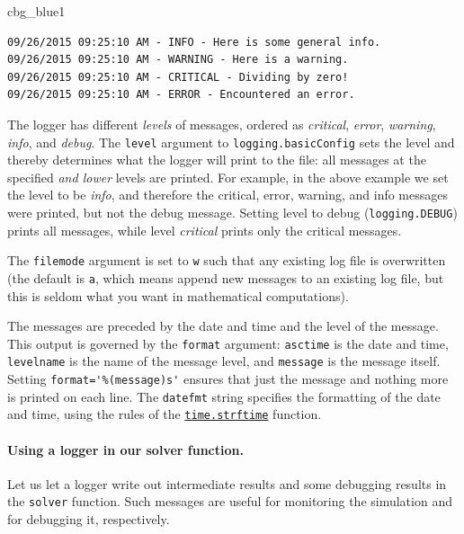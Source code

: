 \documentclass[%
oneside,                 %
final,                   %
10pt]{article}
\newenvironment{_cod_tight}[1]{
   \def\FrameCommand{\colorbox{#1}}
   \FrameRule0.6pt\MakeFramed {\FrameRestore}\vskip3mm}
   {\vskip0mm\endMakeFramed}
\newenvironment{cod}[1]{
\bgroup\rmfamily
\fboxsep=0mm\relax
\begin{_cod_tight}{#1}
\list{}{\parsep=-2mm\parskip=0mm\topsep=0pt\leftmargin=2mm
\rightmargin=2\leftmargin\leftmargin=4pt\relax}
\item\relax}
{\endlist\end{_cod_tight}\egroup}
\begin{document}
\begin{cod}{cbg_blue1}\begin{Verbatim}[numbers=none,fontsize=\fontsize{9pt}{9pt},baselinestretch=0.95,xleftmargin=2mm]
09/26/2015 09:25:10 AM - INFO - Here is some general info.
09/26/2015 09:25:10 AM - WARNING - Here is a warning.
09/26/2015 09:25:10 AM - CRITICAL - Dividing by zero!
09/26/2015 09:25:10 AM - ERROR - Encountered an error.
\end{Verbatim}
\end{cod}
\noindent
The logger has different \emph{levels} of messages, ordered as
\emph{critical}, \emph{error}, \emph{warning}, \emph{info}, and \emph{debug}.
The \texttt{level} argument to \texttt{logging.basicConfig} sets the level
and thereby determines what the logger will print to the file:
all messages at the specified \emph{and lower} levels are printed.
For example, in the above example we set the level to be
\emph{info}, and therefore the critical, error, warning, and info
messages were printed, but not the debug message.
Setting level to debug (\texttt{logging.DEBUG}) prints all messages,
while level \emph{critical} prints only the critical messages.

The \texttt{filemode} argument is set to \texttt{w} such that any existing
log file is overwritten (the default is \texttt{a}, which means append
new messages to an existing log file, but this is seldom what
you want in mathematical computations).

The messages are preceded by the date and time and the level of
the message. This output is governed by the \texttt{format} argument:
\texttt{asctime} is the date and time, \texttt{levelname} is the name of
the message level, and \texttt{message} is the message itself.
Setting \Verb!format='%(message)s'! ensures that just the message and
nothing more is printed on each line. The \texttt{datefmt} string
specifies the formatting of the date and time, using the
rules of the \href{{https://docs.python.org/2/library/time.html#time.strftime}}{\nolinkurl{time.strftime}} function.

\paragraph{Using a logger in our solver function.}
Let us let a logger write out intermediate results and some debugging
results in the \texttt{solver} function. Such messages are useful for
monitoring the simulation and for debugging it, respectively.
\end{document}
